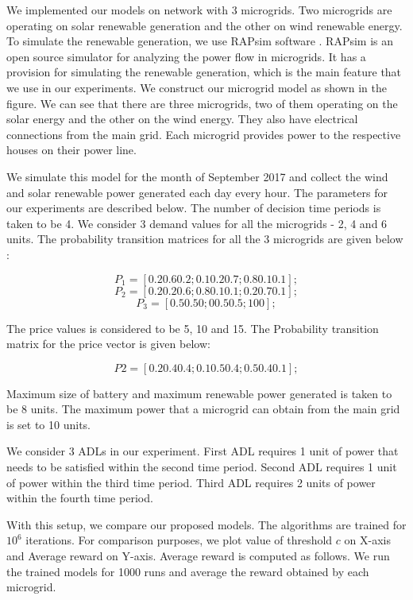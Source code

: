 We implemented our models on network with 3 microgrids. Two microgrids are operating on solar renewable generation and the other on wind renewable energy. To simulate the renewable generation, we use RAPsim software \cite{rapsim}. RAPsim is an open source simulator for analyzing the power flow in microgrids. It has a provision for simulating the renewable generation, which is the main feature that we use in our experiments. We construct our microgrid model as shown in the figure. We can see that there are three microgrids, two of them operating on the solar energy and the other on the wind energy. They also have electrical connections from the main grid. Each microgrid provides power to the respective houses on their power line. 


We simulate this model for the month of September 2017 and collect the wind and solar renewable power generated each day every hour. The parameters for our experiments are described below. The number of decision time periods is taken to be 4. We consider 3 demand values for all the microgrids - 2, 4 and 6 units. The probability transition matrices for all the 3 microgrids are given below :

$$
P_{1} = [0.2 0.6 0.2;0.1 0.2 0.7;0.8 0.1 0.1]; $$
$$
P_{2} = [0.2 0.2 0.6;0.8 0.1 0.1;0.2 0.7 0.1]; $$
$$P_{3} = [0.5 0.5 0;0 0.5 0.5;1 0 0];$$

The price values is considered to be 5, 10 and 15. The Probability transition matrix for the price vector is given below:

$$ P2 = [0.2 0.4 0.4;0.1 0.5 0.4;0.5 0.4 0.1];$$

Maximum size of battery and maximum renewable power generated is taken to be 8 units. The maximum power that a microgrid can obtain from the main grid is set to 10 units.

We consider 3 ADLs in our experiment. First ADL requires 1 unit of power that needs to be satisfied within the second time period. Second ADL requires 1 unit of power within the third time period. Third ADL requires 2 units of power within the fourth time period. 

With this setup, we compare our proposed models. The algorithms are trained for $10^6$ iterations. For comparison purposes, we plot value of threshold $c$ on X-axis and Average reward on Y-axis. Average reward is computed as follows. We run the trained models for 1000 runs and average the reward obtained by each microgrid. 

